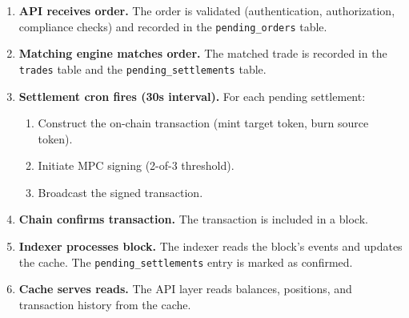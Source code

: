 \begin{enumerate}[nosep]
  \item \textbf{API receives order.}  The order is validated
        (authentication, authorization, compliance checks) and
        recorded in the \texttt{pending\_orders} table.
  \item \textbf{Matching engine matches order.}  The matched trade
        is recorded in the \texttt{trades} table and the
        \texttt{pending\_settlements} table.
  \item \textbf{Settlement cron fires (30s interval).}  For each
        pending settlement:
        \begin{enumerate}[nosep]
          \item Construct the on-chain transaction (mint target token,
                burn source token).
          \item Initiate MPC signing (2-of-3 threshold).
          \item Broadcast the signed transaction.
        \end{enumerate}
  \item \textbf{Chain confirms transaction.}  The transaction is
        included in a block.
  \item \textbf{Indexer processes block.}  The indexer reads the
        block's events and updates the cache.  The
        \texttt{pending\_settlements} entry is marked as confirmed.
  \item \textbf{Cache serves reads.}  The API layer reads balances,
        positions, and transaction history from the cache.
\end{enumerate}

